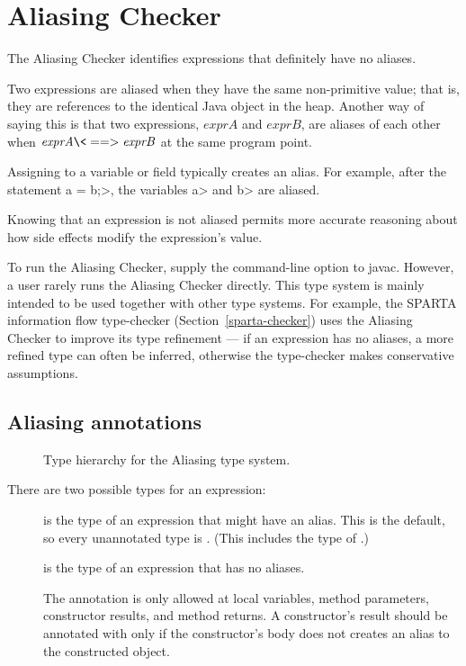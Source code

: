 \htmlhr
\chapter{Aliasing Checker\label{aliasing-checker}}

The Aliasing Checker identifies expressions that definitely have no
aliases.

Two expressions are aliased when they have the same non-primitive value;
that is, they are references to the identical Java object
in the heap. Another way of saying this is that two expressions,
$\mathit{exprA}$ and $\mathit{exprB}$, are aliases of each other when
$\mathit{exprA} \<==> \mathit{exprB}$ at the same program point.

Assigning to a variable or field typically creates an alias.  For example,
after the statement \<a = b;>, the variables \<a> and \<b> are aliased.

Knowing that an expression is not aliased permits more accurate reasoning
about how side effects modify the expression's value.

To run the Aliasing Checker, supply the
command-line option to javac.
However, a user rarely runs the Aliasing Checker directly.
This type system is mainly intended to be used together with other type systems.
For example, the SPARTA information flow type-checker
(Section~\ref{sparta-checker}) uses the Aliasing Checker to improve its
type refinement --- if an expression has no aliases, a more refined type
can often be inferred, otherwise the type-checker makes conservative
assumptions.

\section{Aliasing annotations\label{aliasing-annotations}}

\begin{figure}
\caption{Type hierarchy for the Aliasing type system.}
\label{fig-aliasing-hierarchy}
\end{figure}

There are two possible types for an expression:

\begin{description}

\item[]
is the type of an expression that might have an alias.
This is the default, so every unannotated type is
. (This includes the type of .)

\item[]
is the type of an expression that has no aliases.

The  annotation is only allowed at local variables, method
parameters, constructor results, and method returns.
A constructor's result should be annotated with  only if the
constructor's body does not creates an alias to the constructed object.

\end{description}

